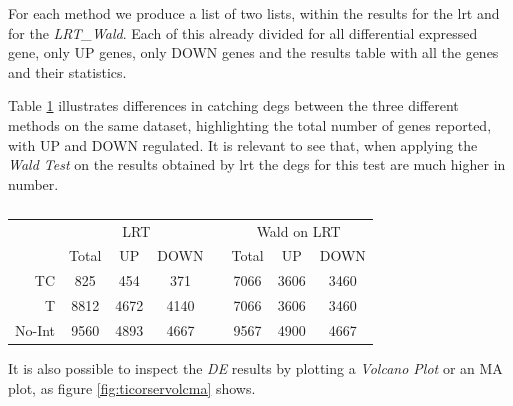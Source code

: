 For each method we produce a list of two lists, within the results for the \gls{lrt} and for the \textit{LRT\_Wald}. Each of this already divided for all differential expressed gene, only UP genes, only DOWN genes and the results table with all the genes and their statistics.

Table \ref{tab:ticorserderesults} illustrates differences in catching \glspl{deg} between the three different methods on the same dataset, highlighting the total number of genes reported, with UP and DOWN regulated. 
It is relevant to see that, when applying the \textit{Wald Test} on the results obtained by \gls{lrt} the \glspl{deg} for this test are much higher in number.

\begin{table}[H]
\centering
\begin{tabular}{r c c c c c c c}
\multicolumn{1}{r}{} & \multicolumn{3}{c}{LRT} && \multicolumn{3}{c}{Wald on LRT} \\
\multicolumn{1}{r}{} & Total & UP & DOWN && Total & UP & DOWN \\
\cline{2-4}\cline{6-8}
TC & 825 & 454 & 371 && 7066 & 3606 & 3460 \\
T & 8812 & 4672 & 4140 && 7066 & 3606 & 3460 \\
No-Int & 9560 & 4893 & 4667 && 9567 & 4900 & 4667 \\

\end{tabular}
\caption[\gls{tic} DE methods results]{}
\label{tab:ticorserderesults}
\end{table}


It is also possible to inspect the \textit{DE} results by plotting a \textit{Volcano Plot} or an MA plot, as figure \ref{fig:ticorservolcma} shows.

